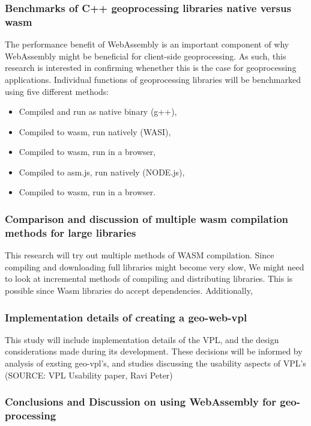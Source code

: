\subsubsection*{Benchmarks of C++ geoprocessing libraries native versus wasm}

The performance benefit of WebAssembly is an important component of why WebAssembly might be beneficial for client-side geoprocessing. As such, this research is interested in confirming whenether this is the case for geoprocessing applications. Individual functions of geoprocessing libraries will be benchmarked using five different methods: 

\begin{itemize}
    \item Compiled and run as native binary (g++), 
    \item Compiled to wasm, run natively (WASI),
    \item Compiled to wasm, run in a browser,
    \item Compiled to asm.js, run natively (NODE.js),
    \item Compiled to wasm, run in a browser. 
\end{itemize}


\subsubsection*{Comparison and discussion of multiple wasm compilation methods for large libraries}
This research will try out multiple methods of WASM compilation. 
Since compiling and downloading full libraries might become very slow, We might need to look at incremental methods of compiling and distributing libraries. 
This is possible since Wasm libraries do accept dependencies. 
Additionally, 


\subsubsection*{Implementation details of creating a geo-web-vpl}

This study will include implementation details of the VPL, and the design considerations made during its development. These decisions will be informed by analysis of exsting geo-vpl's, and studies discussing the usability aspects of VPL's (SOURCE: VPL Usability paper,  Ravi Peter)


\subsubsection*{Conclusions and Discussion on using WebAssembly for geo-processing}

